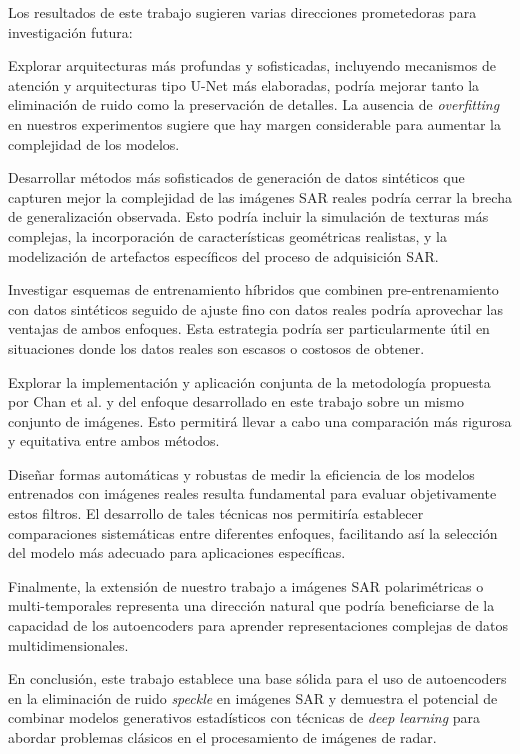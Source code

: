 Los resultados de este trabajo sugieren varias direcciones prometedoras para investigación futura:

Explorar arquitecturas más profundas y sofisticadas, incluyendo mecanismos de atención y arquitecturas tipo U-Net más elaboradas, podría mejorar tanto la eliminación de ruido como la preservación de detalles. La ausencia de \emph{overfitting} en nuestros experimentos sugiere que hay margen considerable para aumentar la complejidad de los modelos.

Desarrollar métodos más sofisticados de generación de datos sintéticos que capturen mejor la complejidad de las imágenes SAR reales podría cerrar la brecha de generalización observada. Esto podría incluir la simulación de texturas más complejas, la incorporación de características geométricas realistas, y la modelización de artefactos específicos del proceso de adquisición SAR.

Investigar esquemas de entrenamiento híbridos que combinen pre-entrenamiento con datos sintéticos seguido de ajuste fino con datos reales podría aprovechar las ventajas de ambos enfoques. Esta estrategia podría ser particularmente útil en situaciones donde los datos reales son escasos o costosos de obtener.

Explorar la implementación y aplicación conjunta de la metodología propuesta por Chan et al. \cite{chan2022entropy} y del enfoque desarrollado en este trabajo sobre un mismo conjunto de imágenes. Esto permitirá llevar a cabo una comparación más rigurosa y equitativa entre ambos métodos.

Diseñar formas automáticas y robustas de medir la eficiencia de los modelos entrenados con imágenes reales resulta fundamental para evaluar objetivamente estos filtros. El desarrollo de tales técnicas nos permitiría establecer comparaciones sistemáticas entre diferentes enfoques, facilitando así la selección del modelo más adecuado para aplicaciones específicas.

Finalmente, la extensión de nuestro trabajo a imágenes SAR polarimétricas o multi-temporales representa una dirección natural que podría beneficiarse de la capacidad de los autoencoders para aprender representaciones complejas de datos multidimensionales.

En conclusión, este trabajo establece una base sólida para el uso de autoencoders en la eliminación de ruido \emph{speckle} en imágenes SAR y demuestra el potencial de combinar modelos generativos estadísticos con técnicas de \emph{deep learning} para abordar problemas clásicos en el procesamiento de imágenes de radar.
